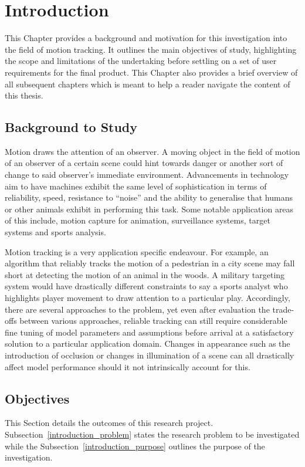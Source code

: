 \chapter{Introduction}\label{chapter_introduction}
This Chapter provides a background and motivation for this investigation
into the field of motion tracking. It outlines the main objectives of study,
highlighting the scope and limitations of the undertaking before settling on a
set of user requirements for the final product. This Chapter also provides a
brief overview of all subsequent chapters which is meant
to help a reader navigate the content of this thesis.

\section{Background to Study}
Motion draws the attention of an observer. A moving object in the field of
motion of an observer of a certain scene could hint towards danger or another
sort of change to said observer's immediate environment. Advancements in
technology aim to have machines exhibit the same level of sophistication in terms of
reliability, speed, resistance to ``noise'' and the ability to generalise that
humans or other animals exhibit in performing this task. Some notable
application areas of this include, motion capture for animation, surveillance
systems, target systems and sports analysis.

Motion tracking is a very application specific endeavour. For example, an
algorithm that reliably tracks the motion of a pedestrian in a city scene may fall
short at detecting the motion of an animal in the woods. A military targeting
system would have drastically different constraints to say a sports analyst
who highlights player movement to draw attention to a particular play.
Accordingly, there are several approaches to the problem, yet even after evaluation
the trade-offs between various approaches, reliable tracking can still require
considerable fine tuning of model parameters and assumptions before arrival at a
satisfactory solution to a particular application domain. 
Changes in appearance such as the introduction of occlusion or changes in
illumination of a scene can all drastically affect model performance should it
not intrinsically account for this.


\section{Objectives}\label{introduction_objectives}
This Section details the outcomes of this research project.
Subsection~\ref{introduction_problem} states the research problem to be
investigated while the Subsection~\ref{introduction_purpose} outlines the
purpose of the investigation.

